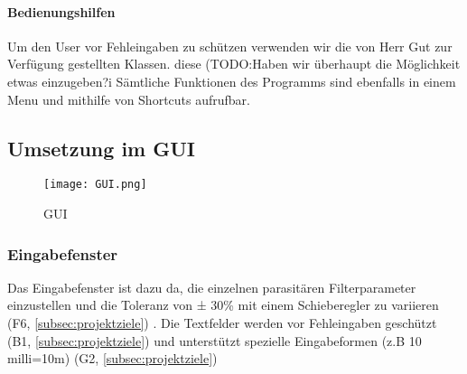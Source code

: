 \paragraph{Bedienungshilfen}\label{para:bedienungshilfen}
		Um den User vor Fehleingaben zu schützen verwenden wir die von Herr Gut zur Verfügung gestellten Klassen. diese (TODO:Haben wir überhaupt die Möglichkeit etwas einzugeben?^^)
		Sämtliche Funktionen des Programms sind ebenfalls in einem Menu und mithilfe von Shortcuts aufrufbar.





\subsection{Umsetzung im GUI}\label{subsec:umsetzungimgui}

\begin{figure}[H]
	\centering
	\texttt{[image: GUI.png]}
	\caption{GUI}
	\label{fig:GUI}
\end{figure}

\subsubsection{Eingabefenster} \label{subsubsec:eingabefenster}

Das Eingabefenster ist dazu da, die einzelnen parasitären Filterparameter einzustellen und die Toleranz von ± 30\% mit einem Schieberegler zu variieren (F6,  \ref{subsec:projektziele}) . Die  Textfelder werden vor Fehleingaben geschützt (B1,  \ref{subsec:projektziele}) und unterstützt spezielle Eingabeformen (z.B 10 milli=10m) (G2,  \ref{subsec:projektziele})

